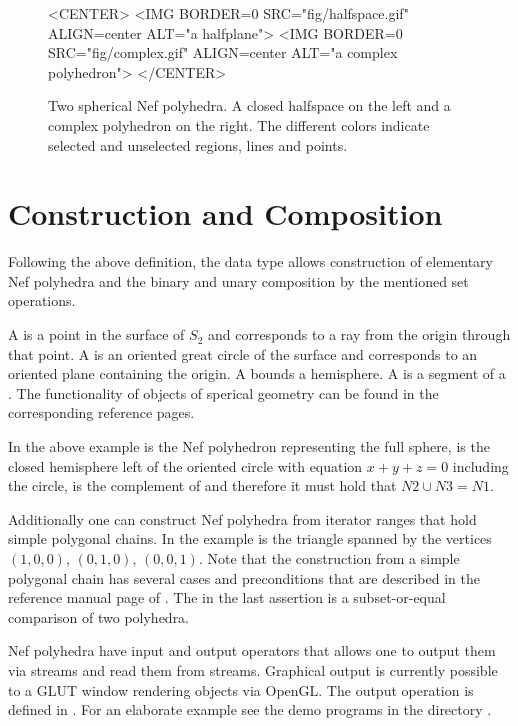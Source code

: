 \begin{figure}[htbp]
\begin{ccTexOnly}
\begin{center}
\end{center}
\end{ccTexOnly}
\caption{Two spherical Nef polyhedra. A closed halfspace on the left 
  and a complex polyhedron on the right. The different colors indicate
  selected and unselected regions, lines and points.}\label{nefexamples}
\begin{ccHtmlOnly}
<CENTER>
<IMG BORDER=0 SRC="fig/halfspace.gif" ALIGN=center
ALT="a halfplane">
<IMG BORDER=0 SRC="fig/complex.gif" ALIGN=center
ALT="a complex polyhedron">
</CENTER>
\end{ccHtmlOnly}
\end{figure}      

\section{Construction and Composition}

Following the above definition, the data type
 allows construction of elementary Nef
polyhedra and the binary and unary composition by the mentioned set
operations.

A  is a point in the surface of $S_2$ and
corresponds to a ray from the origin through that point. A
 is an oriented great circle of the surface and
corresponds to an oriented plane containing the origin. A
 bounds a hemisphere. A  is 
a segment of a . The functionality of objects
of sperical geometry can be found in the corresponding reference
pages.


In the above example  is the Nef polyhedron representing
the full sphere,  is the closed hemisphere left of the
oriented circle with equation $x + y + z = 0$ including the circle,
 is the complement of  and therefore it must hold that
$N2 \cup N3 = N1$.

Additionally one can construct Nef polyhedra from iterator ranges that
hold simple polygonal chains. In the example  is the triangle
spanned by the vertices $(1,0,0)$, $(0,1,0)$, $(0,0,1)$.  Note that
the construction from a simple polygonal chain has several cases and
preconditions that are described in the reference manual page of
. The  in the last assertion
is a subset-or-equal comparison of two polyhedra.

Nef polyhedra have input and output operators that allows one to
output them via streams and read them from streams. Graphical output
is currently possible to a GLUT window rendering objects via OpenGL.
The output operation is defined in
. For an elaborate
example see the demo programs in the directory .

